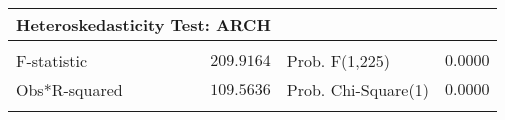 \begin{tabular}{lrrrr}
\toprule
\multicolumn{2}{l}{Heteroskedasticity Test: ARCH}&\multicolumn{1}{c}{}&\multicolumn{1}{c}{}&\multicolumn{1}{c}{}\\
[4.5pt] \hline \\ [-4.5pt]
\multicolumn{1}{l}{F-statistic}&\multicolumn{1}{r}{$209.9164$}&\multicolumn{2}{l}{Prob. F(1,225)}&\multicolumn{1}{r}{$0.0000$}\\
\multicolumn{1}{l}{Obs*R-squared}&\multicolumn{1}{r}{$109.5636$}&\multicolumn{2}{l}{Prob. Chi-Square(1)}&\multicolumn{1}{r}{$0.0000$}\\
[4.5pt] \bottomrule \\ [-4.5pt]
\end{tabular}
